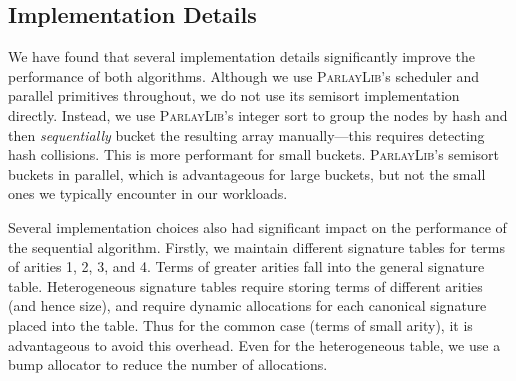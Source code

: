 \subsection{Implementation Details}

We have found that several implementation details significantly improve the
performance of both algorithms. Although we use \textsc{ParlayLib}'s scheduler
and parallel primitives throughout, we do not use its semisort implementation
directly. Instead, we use \textsc{ParlayLib}'s integer sort to group the nodes
by hash and then \emph{sequentially} bucket the resulting array manually---this
requires detecting hash collisions. This is more performant for small buckets.
\textsc{ParlayLib}'s semisort buckets in parallel, which is advantageous for
large buckets, but not the small ones we typically encounter in our workloads.

Several implementation choices also had significant impact on the performance
of the sequential algorithm. Firstly, we maintain different signature tables
for terms of arities 1, 2, 3, and 4. Terms of greater arities fall into the
general signature table. Heterogeneous signature tables require storing terms
of different arities (and hence size), and require dynamic allocations for
each canonical signature placed into the table. Thus for the common case
(terms of small arity), it is advantageous to avoid this overhead. Even for
the heterogeneous table, we use a bump allocator to reduce the number of
allocations.
